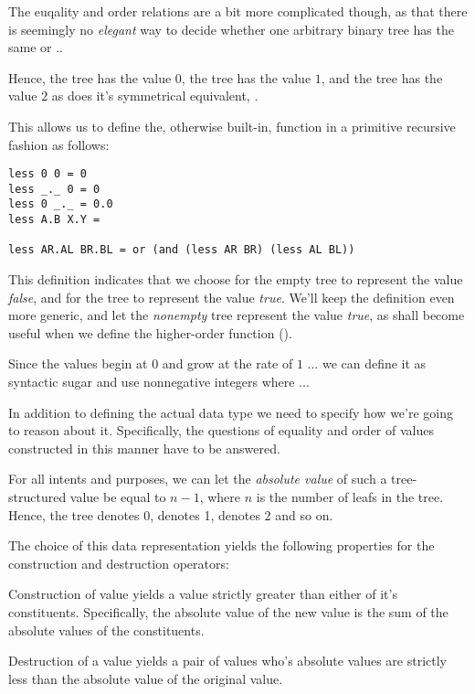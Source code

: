 The euqality and order relations are a bit more complicated though, as that
there is seemingly no \emph{elegant} way to decide whether one arbitrary binary
tree has the same or ..

Hence, the tree  has the value $0$, the tree  has the value
$1$, and the tree  has the value $2$ as does it's symmetrical
equivalent, .

This allows us to define the, otherwise built-in, function  in a
primitive recursive fashion as follows:

\begin{verbatim}
less 0 0 = 0
less _._ 0 = 0
less 0 _._ = 0.0
less A.B X.Y = 

less AR.AL BR.BL = or (and (less AR BR) (less AL BL))
\end{verbatim}

This definition indicates that we choose for the empty tree to represent the
value \emph{false}, and for the tree  to represent the value
\emph{true}. We'll keep the definition even more generic, and let the
\emph{nonempty} tree represent the value \emph{true}, as shall become useful
when we define the higher-order function 
().

Since the values begin at $0$ and grow at the rate of $1$ ... we can define it
as syntactic sugar and use nonnegative integers where ...

In addition to defining the actual data type we need to specify how we're going
to reason about it. Specifically, the questions of equality and order of values
constructed in this manner have to be answered.

For all intents and purposes, we can let the \emph{absolute value} of such a
tree-structured value be equal to $n-1$, where $n$ is the number of leafs in
the tree. Hence, the tree  denotes $0$,  denotes 1,
 denotes 2 and so on.

The choice of this data representation yields the following properties for the
construction and destruction operators:

\begin{lemma} Construction of value yields a value strictly greater than either
of it's constituents. Specifically, the absolute value of the new value is the
sum of the absolute values of the constituents.\end{lemma}

\begin{lemma} Destruction of a value yields a pair of values who's absolute
values are strictly less than the absolute value of the original
value.\end{lemma}

